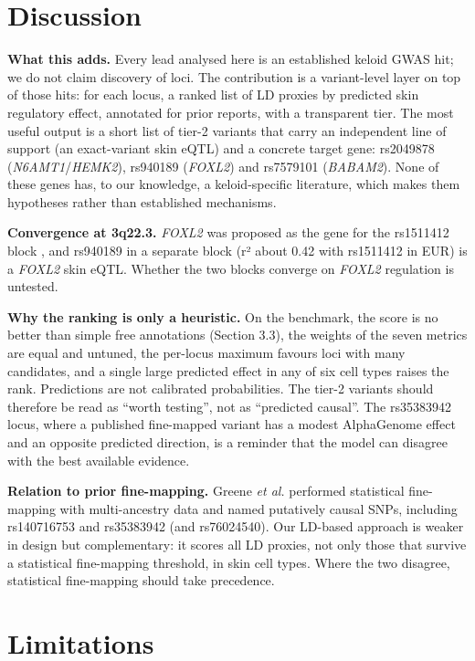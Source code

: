 \documentclass[10pt,twocolumn,a4paper]{article}
\begin{document}
\section{Discussion}

\textbf{What this adds.} Every lead analysed here is an established keloid GWAS hit; we do not claim discovery of loci. The contribution is a variant-level layer on top of those hits: for each locus, a ranked list of LD proxies by predicted skin regulatory effect, annotated for prior reports, with a transparent tier. The most useful output is a short list of tier-2 variants that carry an independent line of support (an exact-variant skin eQTL) and a concrete target gene: rs2049878 (\emph{N6AMT1}/\emph{HEMK2}), rs940189 (\emph{FOXL2}) and rs7579101 (\emph{BABAM2}). None of these genes has, to our knowledge, a keloid-specific literature, which makes them hypotheses rather than established mechanisms.

\textbf{Convergence at 3q22.3.} \emph{FOXL2} was proposed as the gene for the rs1511412 block \cite{k2,k5}, and rs940189 in a separate block (r² about 0.42 with rs1511412 in EUR) is a \emph{FOXL2} skin eQTL. Whether the two blocks converge on \emph{FOXL2} regulation is untested.

\textbf{Why the ranking is only a heuristic.} On the benchmark, the score is no better than simple free annotations (Section 3.3), the weights of the seven metrics are equal and untuned, the per-locus maximum favours loci with many candidates, and a single large predicted effect in any of six cell types raises the rank. Predictions are not calibrated probabilities. The tier-2 variants should therefore be read as ``worth testing'', not as ``predicted causal''. The rs35383942 locus, where a published fine-mapped variant has a modest AlphaGenome effect and an opposite predicted direction, is a reminder that the model can disagree with the best available evidence.

\textbf{Relation to prior fine-mapping.} Greene \emph{et al.} \cite{k1} performed statistical fine-mapping with multi-ancestry data and named putatively causal SNPs, including rs140716753 and rs35383942 (and rs76024540). Our LD-based approach is weaker in design but complementary: it scores all LD proxies, not only those that survive a statistical fine-mapping threshold, in skin cell types. Where the two disagree, statistical fine-mapping should take precedence.

\section{Limitations}
\end{document}
